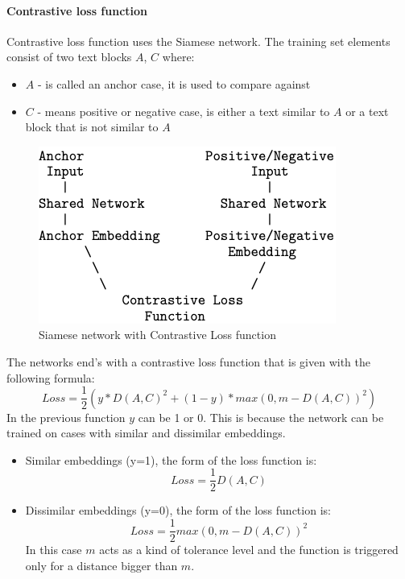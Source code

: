 \documentclass{wseas}
\begin{document}
\paragraph{Contrastive loss function}

Contrastive loss function uses the Siamese network. The training set
elements consist of two text blocks \(A\), \(C\) where:

\begin{itemize}

\item
  \(A\) - is called an anchor case, it is used to compare against
\item
  \(C\) - means positive or negative case, is either a text similar to
  \(A\) or a text block that is not similar to \(A\)
\end{itemize}

\begin{figure}[htbp]
  \centering
  \includegraphics[width=\linewidth]{resources/v1/contrastiveLoss.png}
  \caption{Siamese network with Contrastive Loss function}
  \label{fig:contrastive_loss_function_figure}
\end{figure}

The networks end's with a contrastive loss function that is given with
the following formula:
\begin{equation} 
  Loss =  \frac{1}{2} (y*D(A,C)^2 + (1-y)*max(0,m-D(A,C))^2)
\end{equation}
In the previous function \(y\) can be 1 or 0. This is because the
network can be trained on cases with similar and dissimilar embeddings.

\begin{itemize}

\item
  Similar embeddings (y=1), the form of the loss function is: 
  \begin{equation}
    Loss = \frac{1}{2}D(A,C)
  \end{equation}

\item
  Dissimilar embeddings (y=0), the form of the loss function is: 
  \begin{equation}
    Loss =  \frac{1}{2}max(0,m-D(A,C))^2
  \end{equation}
  In this case \(m\) acts as a kind of tolerance level and the
  function is triggered only for a distance bigger than \(m\).
\end{itemize}
\end{document}
